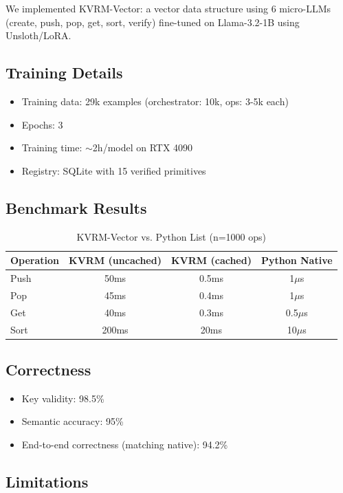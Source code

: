 \documentclass[11pt,a4paper]{article}
\begin{document}
We implemented KVRM-Vector: a vector data structure using 6 micro-LLMs (create, push, pop, get, sort, verify) fine-tuned on Llama-3.2-1B using Unsloth/LoRA.

\subsection{Training Details}

\begin{itemize}
    \item Training data: 29k examples (orchestrator: 10k, ops: 3-5k each)
    \item Epochs: 3
    \item Training time: $\sim$2h/model on RTX 4090
    \item Registry: SQLite with 15 verified primitives
\end{itemize}

\subsection{Benchmark Results}

\begin{table}[h]
\caption{KVRM-Vector vs. Python List (n=1000 ops)}
\centering
\begin{tabular}{@{}lccc@{}}
\toprule
Operation & KVRM (uncached) & KVRM (cached) & Python Native \\
\midrule
Push & 50ms & 0.5ms & 1$\mu$s \\
Pop & 45ms & 0.4ms & 1$\mu$s \\
Get & 40ms & 0.3ms & 0.5$\mu$s \\
Sort & 200ms & 20ms & 10$\mu$s \\
\bottomrule
\end{tabular}
\end{table}

\subsection{Correctness}

\begin{itemize}
    \item Key validity: 98.5\%
    \item Semantic accuracy: 95\%
    \item End-to-end correctness (matching native): 94.2\%
\end{itemize}

\subsection{Limitations}
\end{document}

